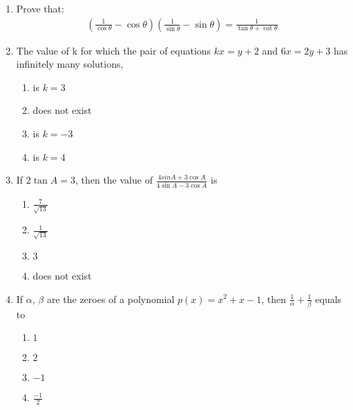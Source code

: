 \documentclass[12pt,-letter paper]{article}
\providecommand{\brak}[1]{\ensuremath{\left(#1\right)}}
\begin{document}
\begin{enumerate}
\item Prove that:\\
\begin{align}
\brak{\frac{1}{\cos\theta}-\cos\theta}\brak{\frac{1}{\sin\theta}-\sin\theta} = \frac{1}{\tan\theta+\cot\theta}
\end{align}


\item The value of k for which the pair of equations $kx=y+2$ and $6x=2y+3$ has infinitely many solutions,
\begin{enumerate}
\item is $k=3$
\item does not exist
\item is $k=-3$
\item is $k=4$
\end{enumerate}


\item If $2\tan A=3$, then the value of $\frac{4sin A + 3\cos A}{4\sin A - 3\cos A}$ is
\begin{enumerate}
\item $\frac{7}{\sqrt{13}}$
\item $\frac{1}{\sqrt{13}}$
\item $3$
\item does not exist
\end{enumerate}


\item If $\alpha$, $\beta$ are the zeroes of a polynomial $p(x)=x^2+x-1$, then $\frac{1}{\alpha}+\frac{1}{\beta}$ equals to 
\begin{enumerate}
\item $1$
\item $2$
\item $-1$
\item $\frac{-1}{2}$
\end{enumerate}



\end{enumerate}
\end{document}
